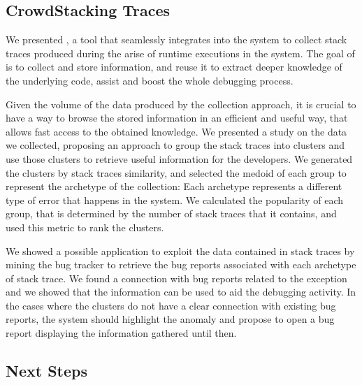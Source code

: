 \subsection{CrowdStacking Traces}

We presented \slr, a tool that seamlessly integrates into the \pha system to collect stack traces produced during the arise of runtime executions in the system.
The goal of \slr is to collect and store information, and reuse it to extract deeper knowledge of the underlying code, assist and boost the whole debugging process.

Given the volume of the data produced by the collection approach, it is crucial to have a way to browse the stored information in an efficient and useful way, that allows fast access to the obtained knowledge.
We presented a study on the data we collected, proposing an approach to group the stack traces into clusters and use those clusters to retrieve useful information for the developers.
We generated the clusters by stack traces similarity, and selected the medoid of each group to represent the archetype of the collection: Each archetype represents a different type of error that happens in the system.
We calculated the popularity of each group, that is determined by the number of stack traces that it contains, and used this metric to rank the clusters.

We showed a possible application to exploit the data contained in stack traces by mining the \pha bug tracker to retrieve the bug reports associated with each archetype of stack trace.
We found a connection with bug reports related to the exception and we showed that the information can be used to aid the debugging activity.
In the cases where the clusters do not have a clear connection with existing bug reports, the system should highlight the anomaly and propose to open a bug report displaying the information gathered until then.

\subsection{Next Steps}

